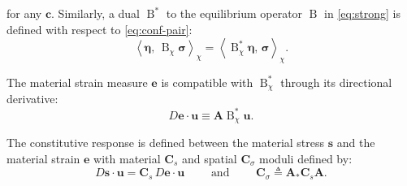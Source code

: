 \begin{description}
for any \(\bm{c}\).
Similarly, a dual
\(\operatorname{B}^*\) to the equilibrium operator \(\operatorname{B}\) in
\eqref{eq:strong} is defined with respect to \eqref{eq:conf-pair}:
\begin{equation}
  \left<\bm{\eta},\, \operatorname{B}_\chi\bm{\sigma}\right>_\chi = \left<\operatorname{B}_\chi^*\bm{\eta},\, \bm{\sigma}\right>_\chi.
  \label{eq:def-adjoint}
\end{equation}
\item[A3]
The material strain measure \(\bm{e}\) is compatible with
\(\operatorname{B}^*_\chi\) through its directional derivative: 
\begin{equation}
  D\bm{e}\cdot\bm{u} \equiv \bm{A}\operatorname{B}^*_\chi \bm{u}.
  \label{eq:vstrain}
\end{equation}
%
\item[A4]
The constitutive response is defined between the material stress
\(\bm{s}\) and the material strain \(\bm{e}\) with material \(\bm{C}_s\) and
spatial \(\bm{C}_\sigma\) moduli defined by:
\begin{equation}
  D \bm{s}\cdot \bm{u} = \bm{C}_s \, D \bm{e}\cdot {\bm{u}}
  \qquad\text{ and }\qquad
  \bm{C}_\sigma \triangleq \bm{A}_*\bm{C}_s\bm{A}.
  \label{eq:def-moduli}
\end{equation}
\end{description}
\fi 
